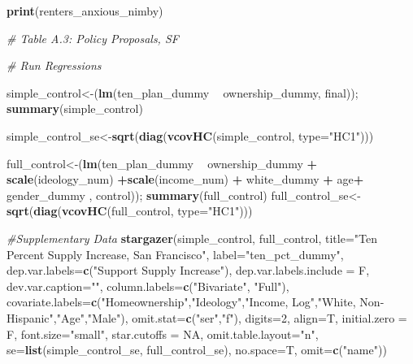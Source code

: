 \documentclass[]{article}
\newenvironment{Shaded}{\begin{snugshade}}{\end{snugshade}}
\newcommand{\CommentTok}[1]{\textcolor[rgb]{0.56,0.35,0.01}{\textit{#1}}}
\newcommand{\DataTypeTok}[1]{\textcolor[rgb]{0.13,0.29,0.53}{#1}}
\newcommand{\DecValTok}[1]{\textcolor[rgb]{0.00,0.00,0.81}{#1}}
\newcommand{\KeywordTok}[1]{\textcolor[rgb]{0.13,0.29,0.53}{\textbf{#1}}}
\newcommand{\NormalTok}[1]{#1}
\newcommand{\OperatorTok}[1]{\textcolor[rgb]{0.81,0.36,0.00}{\textbf{#1}}}
\newcommand{\OtherTok}[1]{\textcolor[rgb]{0.56,0.35,0.01}{#1}}
\newcommand{\StringTok}[1]{\textcolor[rgb]{0.31,0.60,0.02}{#1}}
\begin{document}
\begin{Shaded}
\begin{Highlighting}[]
{{\KeywordTok{print}\NormalTok{(renters_anxious_nimby)}


\CommentTok{# Table A.3: Policy Proposals, SF}

\CommentTok{# Run Regressions}

\NormalTok{simple_control<-(}\KeywordTok{lm}\NormalTok{(ten_plan_dummy }\OperatorTok{~}\StringTok{ }\NormalTok{ownership_dummy, final)); }\KeywordTok{summary}\NormalTok{(simple_control)}

\NormalTok{simple_control_se<-}\KeywordTok{sqrt}\NormalTok{(}\KeywordTok{diag}\NormalTok{(}\KeywordTok{vcovHC}\NormalTok{(simple_control, }\DataTypeTok{type=}\StringTok{"HC1"}\NormalTok{)))}

\NormalTok{full_control<-(}\KeywordTok{lm}\NormalTok{(ten_plan_dummy }\OperatorTok{~}\StringTok{ }\NormalTok{ownership_dummy  }\OperatorTok{+}\StringTok{  }\KeywordTok{scale}\NormalTok{(ideology_num) }\OperatorTok{+}\KeywordTok{scale}\NormalTok{(income_num) }\OperatorTok{+}\StringTok{ }\NormalTok{white_dummy  }\OperatorTok{+}\StringTok{ }\NormalTok{age}\OperatorTok{+}\StringTok{ }\NormalTok{gender_dummy , control)); }\KeywordTok{summary}\NormalTok{(full_control)}
\NormalTok{full_control_se<-}\KeywordTok{sqrt}\NormalTok{(}\KeywordTok{diag}\NormalTok{(}\KeywordTok{vcovHC}\NormalTok{(full_control, }\DataTypeTok{type=}\StringTok{"HC1"}\NormalTok{)))}

\CommentTok{#Supplementary Data}
\KeywordTok{stargazer}\NormalTok{(simple_control, full_control, }\DataTypeTok{title=}\StringTok{"Ten Percent Supply Increase, San Francisco"}\NormalTok{,  }\DataTypeTok{label=}\StringTok{"ten_pct_dummy"}\NormalTok{, }
          \DataTypeTok{dep.var.labels=}\KeywordTok{c}\NormalTok{(}\StringTok{"Support Supply Increase"}\NormalTok{), }\DataTypeTok{dep.var.labels.include =}\NormalTok{ F, }\DataTypeTok{dev.var.caption=}\StringTok{""}\NormalTok{,}
          \DataTypeTok{column.labels=}\KeywordTok{c}\NormalTok{(}\StringTok{"Bivariate"}\NormalTok{, }\StringTok{"Full"}\NormalTok{),}
          \DataTypeTok{covariate.labels=}\KeywordTok{c}\NormalTok{(}\StringTok{"Homeownership"}\NormalTok{,}\StringTok{"Ideology"}\NormalTok{,}\StringTok{"Income, Log"}\NormalTok{,}\StringTok{"White, Non-Hispanic"}\NormalTok{,}\StringTok{"Age"}\NormalTok{,}\StringTok{"Male"}\NormalTok{),}
          \DataTypeTok{omit.stat=}\KeywordTok{c}\NormalTok{(}\StringTok{"ser"}\NormalTok{,}\StringTok{"f"}\NormalTok{), }\DataTypeTok{digits=}\DecValTok{2}\NormalTok{, }\DataTypeTok{align=}\NormalTok{T,}
          \DataTypeTok{initial.zero =}\NormalTok{ F, }\DataTypeTok{font.size=}\StringTok{"small"}\NormalTok{, }\DataTypeTok{star.cutoffs =} \OtherTok{NA}\NormalTok{, }\DataTypeTok{omit.table.layout=}\StringTok{"n"}\NormalTok{,}
          \DataTypeTok{se=}\KeywordTok{list}\NormalTok{(simple_control_se, full_control_se), }\DataTypeTok{no.space=}\NormalTok{T, }\DataTypeTok{omit=}\KeywordTok{c}\NormalTok{(}\StringTok{"name"}\NormalTok{))}


}}
\end{Highlighting}
\end{Shaded}
\end{document}
